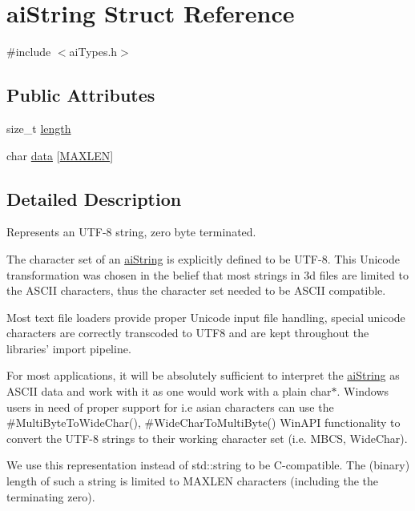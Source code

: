 \hypertarget{structai_string}{\section{ai\-String Struct Reference}
\label{structai_string}
}


{\ttfamily \#include $<$ai\-Types.\-h$>$}

\subsection*{Public Attributes}
\begin{DoxyCompactItemize}
\item 
size\-\_\-t \hyperlink{structai_string_a7d77c2031ff0340746aa046f7fbcf313}{length}
\item 
char \hyperlink{structai_string_aa90b1da7d347a3dcca0a95061e6ea41d}{data} \mbox{[}\hyperlink{ai_types_8h_ae6648cd71a8bd49d58ae8ed33ba910d1}{M\-A\-X\-L\-E\-N}\mbox{]}
\end{DoxyCompactItemize}


\subsection{Detailed Description}
Represents an U\-T\-F-\/8 string, zero byte terminated.

The character set of an \hyperlink{structai_string}{ai\-String} is explicitly defined to be U\-T\-F-\/8. This Unicode transformation was chosen in the belief that most strings in 3d files are limited to the A\-S\-C\-I\-I characters, thus the character set needed to be A\-S\-C\-I\-I compatible.

Most text file loaders provide proper Unicode input file handling, special unicode characters are correctly transcoded to U\-T\-F8 and are kept throughout the libraries' import pipeline.

For most applications, it will be absolutely sufficient to interpret the \hyperlink{structai_string}{ai\-String} as A\-S\-C\-I\-I data and work with it as one would work with a plain char$\ast$. Windows users in need of proper support for i.\-e asian characters can use the \#\-Multi\-Byte\-To\-Wide\-Char(), \#\-Wide\-Char\-To\-Multi\-Byte() Win\-A\-P\-I functionality to convert the U\-T\-F-\/8 strings to their working character set (i.\-e. M\-B\-C\-S, Wide\-Char).

We use this representation instead of std\-::string to be C-\/compatible. The (binary) length of such a string is limited to M\-A\-X\-L\-E\-N characters (including the the terminating zero). 

